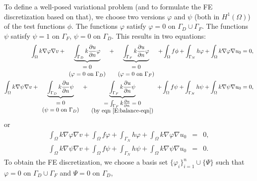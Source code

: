 \documentclass[10pt,a4paper]{article}
\begin{document}
To define a well-posed variational problem (and to formulate
the FE discretization based on that), we choose two versions
$\varphi$ and $\psi$ (both in $H^1(\Omega)$) of the test 
functions $\phi$. The functions $\varphi$ satisfy $\varphi=0$ 
on $\Gamma_D \cup \Gamma_F$. The functions $\psi$ satisfy
$\psi=1$ on $\Gamma_F$, $\psi=0$ on $\Gamma_D$.
This results in two equations:
%
\begin{align}
\int_\Omega k\nabla\varphi \nabla v 
+ \underbrace{\int_{\Gamma_D} k\frac{\partial u}{\partial n} \varphi}_{\begin{array}{c} = 0 \\ (\varphi=0 \ \mathrm{on} \ \Gamma_D) \end{array}} 
+ \underbrace{\int_{\Gamma_F} k\frac{\partial u}{\partial n} \varphi}_{\begin{array}{c} = 0 \\ (\varphi=0 \ \mathrm{on} \ \Gamma_F) \end{array}}
+ \int_\Omega f\phi + \int_{\Gamma_N} h\varphi 
+ \int_\Omega k\nabla\varphi \nabla u_0 &= 0, \nonumber
\\
\int_\Omega k\nabla\psi \nabla v 
+ \underbrace{\int_{\Gamma_D} k\frac{\partial u}{\partial n} \psi}_{\begin{array}{c} = 0 \\ (\psi=0 \ \mathrm{on} \ \Gamma_D) \end{array}}
+ \underbrace{\int_{\Gamma_F} k\frac{\partial u}{\partial n} \psi}_{\begin{array}{c}= \int_{\Gamma_F} k\frac{\partial u}{\partial n} = 0 \\ 
(\mathrm{by \ eqn \ \eqref{E:balance-eqn}}) \end{array}}
+ \int_\Omega f\psi + \int_{\Gamma_N} h\psi 
+ \int_\Omega k\nabla\psi \nabla u_0 &= 0, \nonumber
\end{align}
%
or
\begin{equation}\label{E:weak-form}
\begin{aligned}
\int_\Omega k\nabla\varphi \nabla v + \int_\Omega f\varphi 
+ \int_{\Gamma_N} h\varphi + \int_\Omega k\nabla\varphi \nabla u_0 &=& 0, \\
\int_\Omega k\nabla\psi \nabla v + \int_\Omega f\psi + \int_{\Gamma_N} h\psi 
+ \int_\Omega k\nabla\psi \nabla u_0 &=& 0.
\end{aligned}
\end{equation}
%
To obtain the FE discretization, we choose a basis set 
$\{\varphi_i\}^n_{i=1} \cup \{\Psi\}$ such that $\varphi=0$ 
on $\Gamma_D \cup \Gamma_F$ and $\Psi=0$ on $\Gamma_D$,
\end{document}
